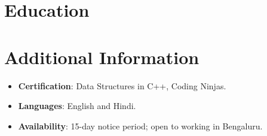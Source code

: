 \documentclass[11pt,a4paper,sans]{moderncv}
\begin{document}

\section{Education}
\vspace{1pt}


\section{Additional Information}
\vspace{1pt}
\begin{itemize}
\item {\textbf{Certification}: Data Structures in C++, Coding Ninjas.}
\item {\textbf{Languages}: English and Hindi.}
\item {\textbf{Availability}: 15-day notice period; open to working in Bengaluru.}
\end{itemize}
\end{document}
